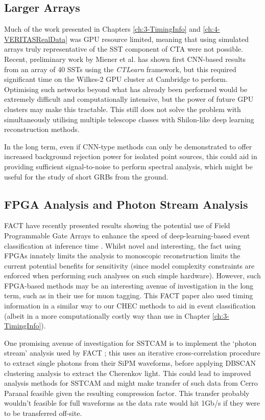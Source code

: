 \subsection{Larger Arrays}
Much of the work presented in Chapters \ref{ch:3-TimingInfo} and \ref{ch:4-VERITASRealData} was GPU resource limited, meaning that using simulated arrays truly representative of the SST component of CTA were not possible. Recent, preliminary work by Miener et al. \cite{tjarkicrc} has shown first CNN-based results from an array of 40 SSTs using the \textit{CTLearn} framework, but this required significant time on the Wilkes-2 GPU cluster at Cambridge to perform. Optimising such networks beyond what has already been performed would be extremely difficult and computationally intensive, but the power of future GPU clusters may make this tractable. This still does not solve the problem with simultaneously utilising multiple telescope classes with Shilon-like deep learning reconstruction methods.

In the long term, even if CNN-type methods can only be demonstrated to offer increased background rejection power for isolated point sources, this could aid in providing sufficient signal-to-noise to perform spectral analysis, which might be useful for the study of short GRBs from the ground.

\subsection{FPGA Analysis and Photon Stream Analysis}

FACT have recently presented results showing the potential use of Field Programmable Gate Arrays to enhance the speed of deep-learning-based event classification at inference time \cite{factfpga}. Whilst novel and interesting, the fact using FPGAs innately limits the analysis to monoscopic reconstruction limits the current potential benefits for sensitivity (since model complexity constraints are enforced when performing such analyses on such simple hardware). However, such FPGA-based methods may be an interesting avenue of investigation in the long term, such as in their use for muon tagging. This FACT paper also used timing information in a similar way to our CHEC methods to aid in event classification (albeit in a more computationally costly way than use in Chapter \ref{ch:3-TimingInfo}).

One promising avenue of investigation for SSTCAM is to implement the `photon stream' analysis used by FACT \cite{factphotonstream}; this uses an iterative cross-correlation procedure to extract single photons from their SiPM waveforms, before applying DBSCAN clustering analysis to extract the Cherenkov light. This could lead to improved analysis methods for SSTCAM and might make transfer of such data from Cerro Paranal feasible given the resulting compression factor. This transfer probably wouldn't feasible for full waveforms as the data rate would hit 1Gb/s \cite{trigrate} if they were to be transferred off-site.

